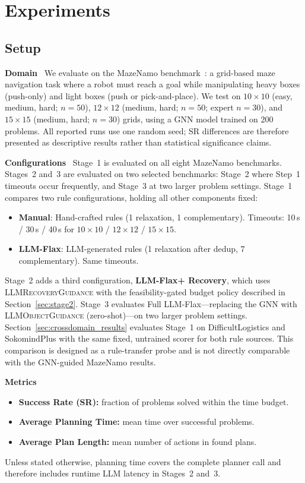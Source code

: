 \documentclass{ieeeaccess}
\newcommand{\sref}[1]{Section~\ref{#1}}
\newcommand{\myparagraph}[1]{\noindent\textbf{#1}~}
\newcommand{\method}{LLM-Flax\xspace}
\newcommand{\fullmethod}{Full LLM-Flax\xspace}
\begin{document}
\section{Experiments}
\label{sec:experiments}

\subsection{Setup}

\myparagraph{Domain}
We evaluate on the MazeNamo benchmark~\cite{silver2021planning}: a grid-based maze navigation task where a robot must reach a goal while manipulating heavy boxes (push-only) and light boxes (push or pick-and-place).
We test on $10{\times}10$ (easy, medium, hard; $n{=}50$), $12{\times}12$ (medium, hard; $n{=}50$; expert $n{=}30$), and $15{\times}15$ (medium, hard; $n{=}30$) grids, using a GNN model trained on 200 problems.
All reported runs use one random seed; SR differences are therefore presented as descriptive results rather than statistical significance claims.

\myparagraph{Configurations}
Stage~1 is evaluated on all eight MazeNamo benchmarks. Stages~2 and~3 are evaluated on two selected benchmarks: Stage~2 where Step~1 timeouts occur frequently, and Stage~3 at two larger problem settings.
Stage~1 compares two rule configurations, holding all other components fixed:
\begin{itemize}[noitemsep,topsep=2pt]
    \item \textbf{Manual}: Hand-crafted rules (1 relaxation, 1 complementary). Timeouts: 10\,s / 30\,s / 40\,s for $10{\times}10$ / $12{\times}12$ / $15{\times}15$.
    \item \textbf{\method}: LLM-generated rules (1 relaxation after dedup, 7 complementary). Same timeouts.
\end{itemize}
Stage~2 adds a third configuration, \textbf{\method + Recovery}, which uses \textsc{LLMRecoveryGuidance} with the feasibility-gated budget policy described in \sref{sec:stage2}.
Stage~3 evaluates \fullmethod---replacing the GNN with \textsc{LLMObjectGuidance} (zero-shot)---on two larger problem settings.
\sref{sec:crossdomain_results} evaluates Stage~1 on DifficultLogistics and SokomindPlus with the same fixed, untrained scorer for both rule sources. This comparison is designed as a rule-transfer probe and is not directly comparable with the GNN-guided MazeNamo results.

\myparagraph{Metrics}
\begin{itemize}[noitemsep,topsep=2pt]
    \item \textbf{Success Rate (SR):} fraction of problems solved within the time budget.
    \item \textbf{Average Planning Time:} mean time over successful problems.
    \item \textbf{Average Plan Length:} mean number of actions in found plans.
\end{itemize}
Unless stated otherwise, planning time covers the complete planner call and therefore includes runtime LLM latency in Stages~2 and~3.
\end{document}
